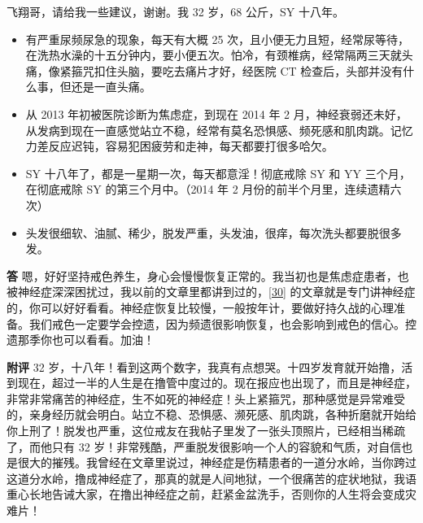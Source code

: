 \begin{case}
    飞翔哥，请给我一些建议，谢谢。我 32 岁，68 公斤，SY 十八年。\begin{itemize}
        \item 有严重尿频尿急的现象，每天有大概 25 次，且小便无力且短，经常尿等待，在洗热水澡的十五分钟内，要小便五次。怕冷，有颈椎病，经常隔两三天就头痛，像紧箍咒扣住头脑，要吃去痛片才好，经医院 CT 检查后，头部并没有什么事，但还是一直头痛。
        \item 从 2013 年初被医院诊断为焦虑症，到现在 2014 年 2 月，神经衰弱还未好，从发病到现在一直感觉站立不稳，经常有莫名恐惧感、频死感和肌肉跳。记忆力差反应迟钝，容易犯困疲劳和走神，每天都要打很多哈欠。
        \item SY 十八年了，都是一星期一次，每天都意淫！彻底戒除 SY 和 YY 三个月，在彻底戒除 SY 的第三个月中。（2014 年 2 月份的前半个月里，连续遗精六次）
        \item 头发很细软、油腻、稀少，脱发严重，头发油，很痒，每次洗头都要脱很多发。
    \end{itemize}

    \textbf{答} 嗯，好好坚持戒色养生，身心会慢慢恢复正常的。我当初也是焦虑症患者，也被神经症深深困扰过，我以前的文章里都讲到过的，\ref{30} 的文章就是专门讲神经症的，你可以好好看看。神经症恢复比较慢，一般按年计，要做好持久战的心理准备。我们戒色一定要学会控遗，因为频遗很影响恢复，也会影响到戒色的信心。控遗那季你也可以看看。加油！

    \textbf{附评} 32 岁，十八年！看到这两个数字，我真有点想哭。十四岁发育就开始撸，活到现在，超过一半的人生是在撸管中度过的。现在报应也出现了，而且是神经症，非常非常痛苦的神经症，生不如死的神经症！头上紧箍咒，那种感觉是异常难受的，亲身经历就会明白。站立不稳、恐惧感、濒死感、肌肉跳，各种折磨就开始给你上刑了！脱发也严重，这位戒友在我帖子里发了一张头顶照片，已经相当稀疏了，而他只有 32 岁！非常残酷，严重脱发很影响一个人的容貌和气质，对自信也是很大的摧残。我曾经在文章里说过，神经症是伤精患者的一道分水岭，当你跨过这道分水岭，撸成神经症了，那真的就是人间地狱，一个很痛苦的症状地狱，我语重心长地告诫大家，在撸出神经症之前，赶紧金盆洗手，否则你的人生将会变成灾难片！
\end{case}


